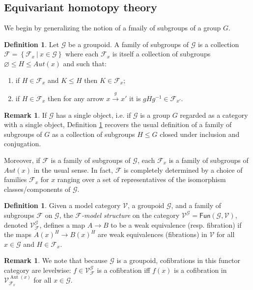\documentclass[a4paper,10pt
,draft
]{article}%
\numberwithin{equation}{section}
\numberwithin{figure}{section}
\theoremstyle{definition} %
\newtheorem{definition}[equation]{Definition}%
\newtheorem{remark}[equation]{Remark}%
\newcommand{\Fun}{\mathsf{Fun}}
\DeclareMathOperator{\Aut}{Aut}%
\newcommand{\F}{\ensuremath{\mathcal F}}
\newcommand{\V}{\ensuremath{\mathcal V}}
\newcommand{\G}{\ensuremath{\mathcal G}}
\newcommand{\1}{\ensuremath{\mathbbm 1}}%
\begin{document}
\subsection{Equivariant homotopy theory}
\label{EHT_SEC}

We begin by generalizing the notion of a fmaily of subgroups of a group $G$.

\begin{definition}\label{FAMGROUPOID DEF}
Let $\G$ be a groupoid.
A family of subgroups of $\G$
is a collection 
$\mathcal{F} = \left\{\mathcal{F}_x\ | \ x\in \G\right\}$
where each $\F_x$ is itself a collection of subgroups
$\varnothing \leq H \leq Aut(x)$ and such that:
\begin{enumerate}[label = (\roman*)]
\item if $H \in \F_x$ and $K \leq H$ then $K \in \mathcal{F}_x$;
\item if $H \in \mathcal{F}_x$
then for any arrow $x \xrightarrow{g} x'$
it is $g H g^{-1} \in \mathcal{F}_{x'}$.
\end{enumerate}
\end{definition}



\begin{remark}
If $\G$ has a single object, i.e. if $\G$ is a group $G$ regarded as a category with a single object, Definition \ref{FAMGROUPOID DEF} recovers the usual definition of a family of subgroups of $G$ as a collection of subgroups $H\leq G$ closed under inclusion and conjugation.

Moreover, if $\F$ is a family of subgroups of $\G$, each $\F_x$ is a family of subgroups of $Aut(x)$ in the usual sense. 
In fact, $\mathcal{F}$ is completely determined by a choice of families
$\F_x$ for $x$ ranging over a set of representatives of the isomorphism classes/components of $\G$.
\end{remark}

\begin{definition}
      Given a model category $\V$, a groupoid $\G$, and a family of subgroups $\F$ on $\G$,
      the \textit{$\F$-model structure} on the category $\V^\G = \Fun(\G, \V)$, denoted $\V^\G_\F$,
      defines a map $A \to B$ to be a 
      weak equivalence (resp. fibration) if the maps $A(x)^H \to B(x)^H$ are weak equivalences (fibrations) in $\V$
      for all $x \in \G$ and $H \in \F_x$.
\end{definition}

\begin{remark}
      \label{SIGMACOF_REM}
      We note that because $\G$ is a groupoid, cofibrations in this functor category are levelwise:
      $f \in \V^\G_\F$ is a cofibration iff $f(x)$ is a cofibration in $\V^{\Aut(x)}_{\F_x}$ for all $x \in \G$.
\end{remark}
\end{document}
